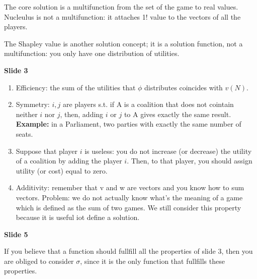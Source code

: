 
%



\noindent The core solution is a multifunction from the set of the game to 
real values. Nucleulus is not a multifunction: it attaches 1! value to the 
vectors of all the players.

\noindent The Shapley value is another solution concept; it is a solution 
function, not a multifunction: you only have one distribution of utilities.

\bigskip
\noindent \textbf{Slide 3}

\begin{enumerate}
	\item Efficiency: the sum of the utilities that $\phi$ distributes 
	coincides with $v(N)$.
	
	\item Symmetry: $i,j$ are players s.t. if A is a coalition that does not 
	cointain neither $i$ nor $j$, then, adding $i$ or $j$ to A gives exactly 
	the same result.
	\textbf{Example:} in a Parliament, two parties with exactly the same 
	number of seats.

	\item Suppose that player $i$ is useless: you do not increase (or decrease) 
	the utility of a coalition by adding the player $i$. Then, to that player, 
	you should assign utility (or cost) equal to zero.

	\item Additivity: remember that v and w are vectors and you know how to 
	sum vectors. Problem: we do not actually know what's the meaning of a game 
	which is defined as the sum of two games. We still consider this property 
	because it is useful iot define a solution.
\end{enumerate}

\bigskip
\noindent \textbf{Slide 5}

\noindent If you believe that a function should fullfill all the properties of 
slide 3, then you are obliged to consider $\sigma$, since it is the only 
function that fullfills these properties.

